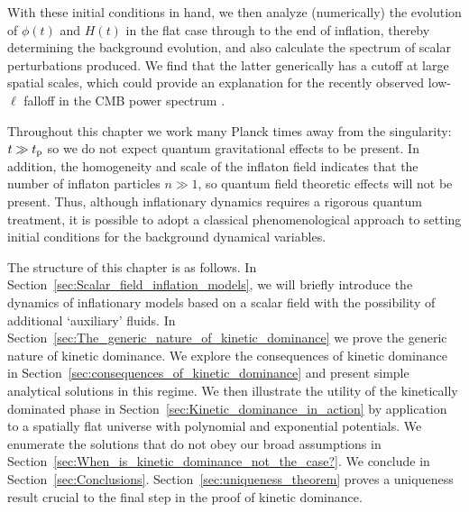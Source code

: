 With these initial conditions in hand, we then analyze (numerically) the evolution of \(\phi(t)\) and \(H(t)\) in the flat case through to the end of inflation, thereby determining the background evolution, and also calculate the spectrum of scalar perturbations produced. We find that the latter generically has a cutoff at large spatial scales, which could provide an explanation for the recently observed low-\(\ell\) falloff in the CMB power spectrum \citep{hinshaw_nine-year_2012,planck_collaboration_planck_2013}.
 
Throughout this chapter we work many Planck times away from the singularity: \(t\gg t_{\mathrm{p}}\) so we do not expect quantum gravitational effects to be present.  In addition, the homogeneity and scale of the inflaton field indicates that the number of inflaton particles \(n\gg1\), so quantum field theoretic effects will not be present.  Thus, although inflationary dynamics requires a rigorous quantum treatment, it is possible to adopt a classical phenomenological approach to setting initial conditions for the background dynamical variables.  

The structure of this chapter is as follows.  In Section~\ref{sec:Scalar_field_inflation_models}, we will briefly introduce the dynamics of inflationary models based on a scalar field with the possibility of additional `auxiliary' fluids.  In Section~\ref{sec:The_generic_nature_of_kinetic_dominance} we prove the generic nature of kinetic dominance.  We explore the consequences of kinetic dominance in Section~\ref{sec:consequences_of_kinetic_dominance} and present simple analytical solutions in this regime.  We then illustrate the utility of the kinetically dominated phase in Section~\ref{sec:Kinetic_dominance_in_action} by application to a spatially flat universe with polynomial and exponential potentials.  We enumerate the solutions that do not obey our broad assumptions in Section~\ref{sec:When_is_kinetic_dominance_not_the_case?}.  We conclude in Section~\ref{sec:Conclusions}. Section~\ref{sec:uniqueness_theorem} proves a uniqueness result crucial to the final step in the proof of kinetic dominance.  

